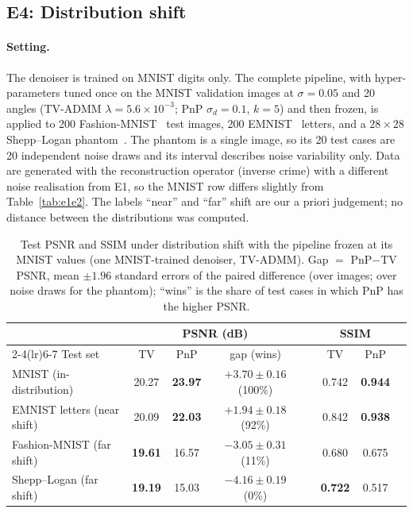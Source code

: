 \subsection{E4: Distribution shift}\label{sec:e4}
\paragraph{Setting.}
The denoiser is trained on MNIST digits only. The complete pipeline, with hyper-parameters tuned once on the MNIST validation images at $\sigma=0.05$ and 20 angles (TV-ADMM $\lambda=5.6\times10^{-3}$; PnP $\sigma_d=0.1$, $k=5$) and then frozen, is applied to 200 Fashion-MNIST~\citep{xiao2017fashion} test images, 200 EMNIST~\citep{cohen2017emnist} letters, and a $28\times28$ Shepp--Logan phantom~\citep{shepp1974}. The phantom is a single image, so its 20 test cases are 20 independent noise draws and its
interval describes noise variability only. Data are generated with the reconstruction operator (inverse crime) with a different noise realisation from E1, so the MNIST row differs slightly from Table~\ref{tab:e1e2}. The labels ``near'' and ``far''
shift are our a priori judgement; no distance between the distributions was computed.

\begin{table}[htbp]
\centering\small\setlength{\tabcolsep}{4pt}
\caption{Test PSNR and SSIM under distribution shift with the pipeline frozen at its MNIST values (one MNIST-trained denoiser, TV-ADMM). Gap $=$ PnP$-$TV PSNR, mean $\pm1.96$ standard errors of the paired difference
(over images; over noise draws for the phantom); ``wins'' is the share of test cases in which PnP has the higher PSNR.}
\label{tab:e4}
\begin{tabular}{lccccccc}
\toprule
 & \multicolumn{3}{c}{PSNR (dB)} & & \multicolumn{2}{c}{SSIM} \\
\cmidrule(lr){2-4}\cmidrule(lr){6-7}
Test set & TV & PnP & gap (wins) & & TV & PnP \\
\midrule
MNIST (in-distribution)       & 20.27 & \textbf{23.97} & $+3.70\pm0.16$ (100\%) & & 0.742 & \textbf{0.944} \\
EMNIST letters (near shift)   & 20.09 & \textbf{22.03} & $+1.94\pm0.18$ (92\%)  & & 0.842 & \textbf{0.938} \\
Fashion-MNIST (far shift)     & \textbf{19.61} & 16.57 & $-3.05\pm0.31$ (11\%) & & 0.680 & 0.675 \\
Shepp--Logan (far shift)      & \textbf{19.19} & 15.03 & $-4.16\pm0.19$ (0\%)  & & \textbf{0.722} & 0.517 \\
\bottomrule
\end{tabular}
\end{table}

